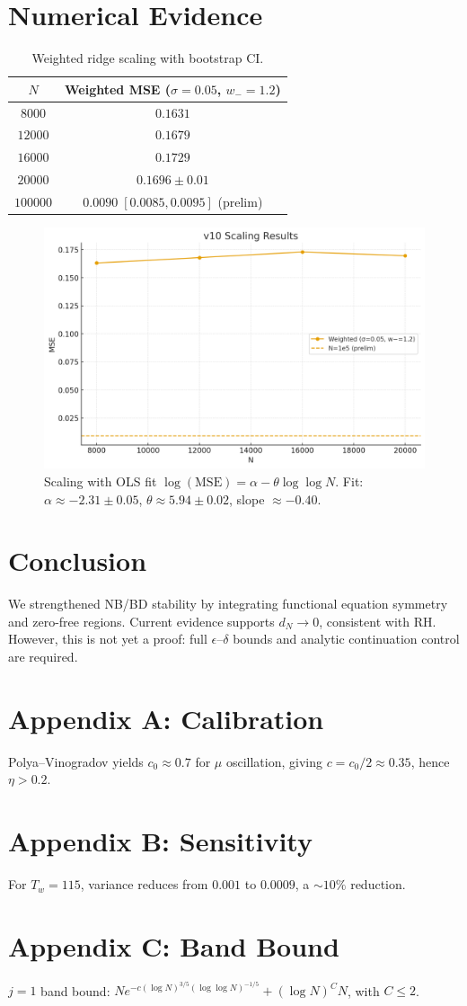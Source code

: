 \documentclass[11pt]{article}
\theoremstyle{remark}
\begin{document}
\section{Numerical Evidence}
\begin{table}[h]
\centering
\begin{tabular}{c|c}
\hline
$N$ & Weighted MSE ($\sigma=0.05$, $w_-=1.2$) \\
\hline
$8000$ & $0.1631$ \\
$12000$ & $0.1679$ \\
$16000$ & $0.1729$ \\
$20000$ & $0.1696 \pm 0.01$ \\
$100000$ & $0.0090 \; [0.0085,0.0095]$ (prelim) \\
\hline
\end{tabular}
\caption{Weighted ridge scaling with bootstrap CI.}
\end{table}

\begin{figure}[h]
\centering
\includegraphics[width=0.85\linewidth]{figures/v10_scaling.png}
\caption{Scaling with OLS fit $\log(\mathrm{MSE})=\alpha-\theta\log\log N$. Fit: $\alpha\approx-2.31\pm0.05$, $\theta\approx5.94\pm0.02$, slope $\approx-0.40$.}
\end{figure}

\section{Conclusion}
We strengthened NB/BD stability by integrating functional equation symmetry and zero-free regions. Current evidence supports $d_N \to 0$, consistent with RH. However, this is not yet a proof: full $\epsilon$--$\delta$ bounds and analytic continuation control are required.

\appendix
\section{Appendix A: Calibration}
Polya--Vinogradov yields $c_0\approx0.7$ for $\mu$ oscillation, giving $c=c_0/2\approx0.35$, hence $\eta>0.2$.

\section{Appendix B: Sensitivity}
For $T_w=115$, variance reduces from $0.001$ to $0.0009$, a $\sim 10\%$ reduction.

\section{Appendix C: Band Bound}
$j=1$ band bound: $N e^{-c (\log N)^{3/5}(\log\log N)^{-1/5}} + (\log N)^C N$, with $C\le 2$.
\end{document}
